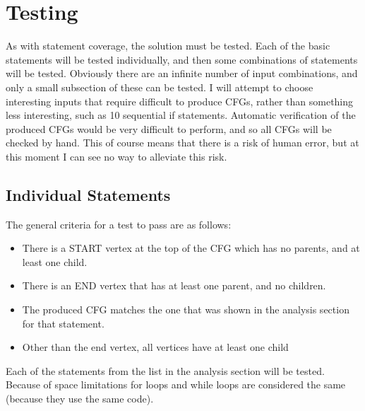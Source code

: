 \section{Testing}

As with statement coverage, the solution must be tested. Each of the basic statements will be tested individually, and then some combinations of statements will be tested. Obviously there are an infinite number of input combinations, and only a small subsection of these can be tested. I will attempt to choose interesting inputs that require difficult to produce CFGs, rather than something less interesting, such as 10 sequential if statements. Automatic verification of the produced CFGs would be very difficult to perform, and so all CFGs will be checked by hand. This of course means that there is a risk of human error, but at this moment I can see no way to alleviate this risk.

\subsection{Individual Statements}

The general criteria for a test to pass are as follows:

\begin{itemize}[nolistsep]
\item There is a START vertex at the top of the CFG which has no parents, and at least one child.
\item There is an END vertex that has at least one parent, and no children.
\item The produced CFG matches the one that was shown in the analysis section for that statement.
\item Other than the end vertex, all vertices have at least one child
\end{itemize}

Each of the statements from the list in the analysis section will be tested. Because of space limitations for loops and while loops are considered the same (because they use the same code).

\begin{figure}
\centering
\begin{minipage}[b]{.25\textwidth}
  \centering
  \caption{}
  \label{fig:testBlock}
\end{minipage}%
\begin{minipage}[b]{.25\textwidth}
  \centering
  \caption{}
  \label{fig:testIf}
\end{minipage}%
\begin{minipage}[b]{.25\textwidth}
  \centering
    \caption{}
  	\label{fig:testIfElse}
\end{minipage}
\begin{minipage}[b]{.24\textwidth}
  \centering
  \caption{}
  \label{fig:testFor}
\end{minipage}
\end{figure}

